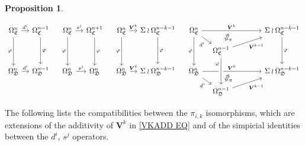 \documentclass[a4paper,10pt
,draft
]{article}%
\numberwithin{equation}{section}
\numberwithin{figure}{section}
\newtheorem{proposition}[equation]{Proposition}%
\theoremstyle{definition} %
\newcommand{\1}{\ensuremath{\mathbbm 1}}%
\begin{document}
\begin{proposition}
\begin{enumerate}[label = (\roman*)]
\[\begin{tikzcd}[column sep = 10pt, row sep = small]
	\Omega^n_{\mathfrak{C}} \ar{r}{d^i} \ar{dd}[swap]{\varphi} &
	\Omega^{n-1}_{\mathfrak{C}} \ar{dd}{\varphi}
&
	\Omega^n_{\mathfrak{C}} \ar{r}{s^j} \ar{dd}[swap]{\varphi} &
	\Omega^{n+1}_{\mathfrak{C}} \ar{dd}{\varphi}
&
	\Omega^n_{\mathfrak{C}} \ar{r}{\boldsymbol{V}^k} \ar{dd}[swap]{\varphi} &
	\Sigma \wr \Omega^{n-k-1}_{\mathfrak{C}} \ar{dd}{\varphi}
&
	\Omega^n_{\mathfrak{C}}
	\ar{rrrrr}[name=toE]{\boldsymbol{V}^k} \ar{rd}[swap]{d^i} \ar{dd}[swap]{\varphi}
	&&&
	&&
	\Sigma \wr \Omega^{n-k-1}_{\mathfrak{C}} \ar{dd}{\varphi}
\\
	&
&
	&
&
	&
&
	&
	|[alias=DBE]|
	\Omega^{n-1}_{\mathfrak{C}} \ar{rrrru}[swap]{\boldsymbol{V}^{k-1}}
\\
	\Omega^n_{\mathfrak{D}} \ar{r}{d^i} &
	\Omega^{n-1}_{\mathfrak{D}}
&
	\Omega^n_{\mathfrak{D}} \ar{r}{s^j} &
	\Omega^n_{\mathfrak{D}}
&
	\Omega^n_{\mathfrak{D}} \ar{r}{\boldsymbol{V}^k} &
	\Sigma \wr \Omega^{n-k-1}_{\mathfrak{D}}
&
	\Omega^n_{\mathfrak{D}} \ar{rrrrr}[name=toB]{\boldsymbol{V}^k} \ar{rd}[swap]{d^i}
	&&&
	&&
	\Sigma \wr \Omega^{n-k-1}_{\mathfrak{D}}
\\
	&
&
	&
&
	&
&
	&
	|[alias=D]| \Omega^{n-1}_{\mathfrak{D}} \ar{rrrru}[swap]{\boldsymbol{V}^{k-1}}
\arrow[Leftrightarrow, from=DBE, to=toE, shorten <=0.15cm,shorten >=0.15cm
,swap,"\pi"
]
	\arrow[Leftrightarrow, from=D, to=toB, shorten <=0.15cm,shorten >=0.15cm,swap,"\pi"]
	\arrow[from=DBE, to=D, crossing over, near start, swap, "\varphi"]
\end{tikzcd}
\]
\end{enumerate}
\end{proposition}


The following lists the compatibilities between the $\pi_{i,k}$ isomorphisms, 
which are extensions of the additivity of $\boldsymbol{V}^k$ in \eqref{VKADD EQ} and of the simpicial identities between the $d^i$, $s^j$ operators.
\end{document}
